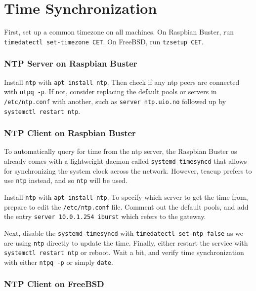 \section{Time Synchronization} \label{time_sync}

First, set up a common timezone on all machines. On Raspbian Buster, run \lstinline{timedatectl set-timezone CET}. On FreeBSD, run \lstinline{tzsetup CET}.


\subsubsection{NTP Server on Raspbian Buster}

Install \lstinline{ntp} with \lstinline{apt install ntp}. Then check if any \gls{ntp} peers are connected with \lstinline{ntpq -p}. If not, consider replacing the default pools or servers in \lstinline{/etc/ntp.conf} with another, such as \lstinline{server ntp.uio.no} followed up by \lstinline{systemctl restart ntp}.



\subsubsection{NTP Client on Raspbian Buster}

To automatically query for time from the \gls{ntp} server, the Raspbian Buster \gls{os} already comes with a lightweight daemon called \lstinline{systemd-timesyncd} that allows for synchronizing the system clock across the network. However, \gls{teacup} prefers to use \lstinline{ntp} instead, and so \lstinline{ntp} will be used.

Install \lstinline{ntp} with \lstinline{apt install ntp}. To specify which server to get the time from, prepare to edit the \lstinline{/etc/ntp.conf} file. Comment out the default pools, and add the entry \lstinline{server 10.0.1.254 iburst} which refers to the gateway.

Next, disable the \lstinline{systemd-timesyncd} with \lstinline{timedatectl set-ntp false} as we are using \lstinline{ntp} directly to update the time. Finally, either restart the service with \lstinline{systemctl restart ntp} or reboot. Wait a bit, and verify time synchronization with either \lstinline{ntpq -p} or simply \lstinline{date}.


\subsubsection{NTP Client on FreeBSD}

